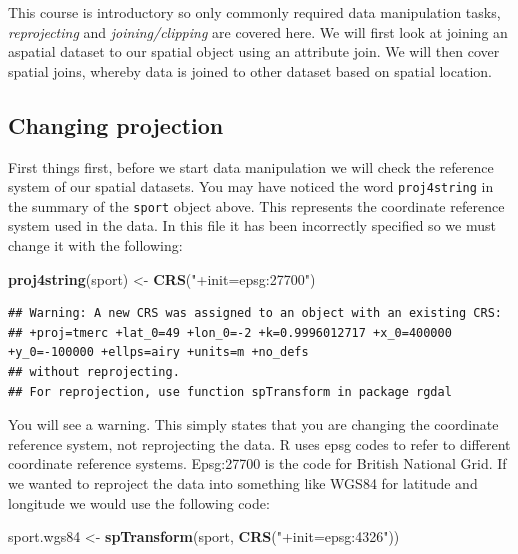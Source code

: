 \documentclass[]{article}
\newenvironment{Shaded}{}{}
\newcommand{\KeywordTok}[1]{\textcolor[rgb]{0.00,0.44,0.13}{\textbf{{#1}}}}
\newcommand{\StringTok}[1]{\textcolor[rgb]{0.25,0.44,0.63}{{#1}}}
\newcommand{\NormalTok}[1]{{#1}}
\begin{document}
This course is introductory so only commonly required data manipulation
tasks, \emph{reprojecting} and \emph{joining/clipping} are covered here.
We will first look at joining an aspatial dataset to our spatial object
using an attribute join. We will then cover spatial joins, whereby data
is joined to other dataset based on spatial location.

\subsection{Changing projection}\label{changing-projection}

First things first, before we start data manipulation we will check the
reference system of our spatial datasets. You may have noticed the word
\texttt{proj4string} in the summary of the \texttt{sport} object above.
This represents the coordinate reference system used in the data. In
this file it has been incorrectly specified so we must change it with
the following:

\begin{Shaded}
\begin{Highlighting}[]
\KeywordTok{proj4string}\NormalTok{(sport) <-}\StringTok{ }\KeywordTok{CRS}\NormalTok{(}\StringTok{"+init=epsg:27700"}\NormalTok{)}
\end{Highlighting}
\end{Shaded}

\begin{verbatim}
## Warning: A new CRS was assigned to an object with an existing CRS:
## +proj=tmerc +lat_0=49 +lon_0=-2 +k=0.9996012717 +x_0=400000 +y_0=-100000 +ellps=airy +units=m +no_defs
## without reprojecting.
## For reprojection, use function spTransform in package rgdal
\end{verbatim}

You will see a warning. This simply states that you are changing the
coordinate reference system, not reprojecting the data. R uses epsg
codes to refer to different coordinate reference systems. Epsg:27700 is
the code for British National Grid. If we wanted to reproject the data
into something like WGS84 for latitude and longitude we would use the
following code:

\begin{Shaded}
\begin{Highlighting}[]
\NormalTok{sport.wgs84 <-}\StringTok{ }\KeywordTok{spTransform}\NormalTok{(sport, }\KeywordTok{CRS}\NormalTok{(}\StringTok{"+init=epsg:4326"}\NormalTok{))}
\end{Highlighting}
\end{Shaded}
\end{document}
